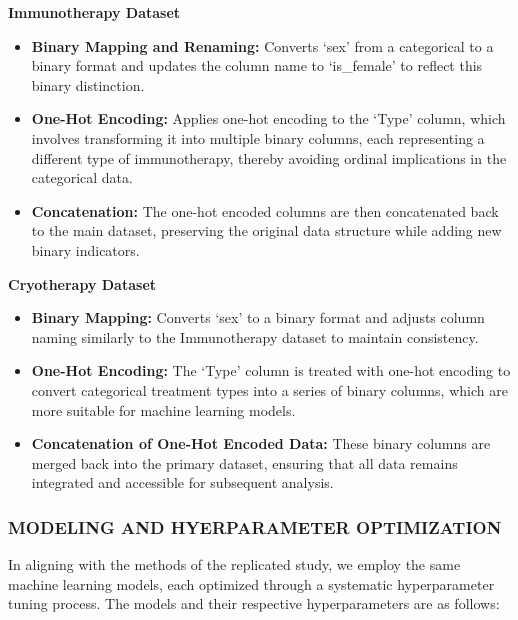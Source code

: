 \documentclass[11pt]{article}
\providecommand{\tightlist}{%
      \setlength{\itemsep}{0pt}\setlength{\parskip}{0pt}}
\begin{document}
\textbf{Immunotherapy Dataset}

\begin{itemize}
\tightlist
\item
  \textbf{Binary Mapping and Renaming:} Converts `sex' from a
  categorical to a binary format and updates the column name to
  `is\_female' to reflect this binary distinction.
\item
  \textbf{One-Hot Encoding:} Applies one-hot encoding to the `Type'
  column, which involves transforming it into multiple binary columns,
  each representing a different type of immunotherapy, thereby avoiding
  ordinal implications in the categorical data.
\item
  \textbf{Concatenation:} The one-hot encoded columns are then
  concatenated back to the main dataset, preserving the original data
  structure while adding new binary indicators.
\end{itemize}

\textbf{Cryotherapy Dataset}

\begin{itemize}
\tightlist
\item
  \textbf{Binary Mapping:} Converts `sex' to a binary format and adjusts
  column naming similarly to the Immunotherapy dataset to maintain
  consistency.
\item
  \textbf{One-Hot Encoding:} The `Type' column is treated with one-hot
  encoding to convert categorical treatment types into a series of
  binary columns, which are more suitable for machine learning models.
\item
  \textbf{Concatenation of One-Hot Encoded Data:} These binary columns
  are merged back into the primary dataset, ensuring that all data
  remains integrated and accessible for subsequent analysis.
\end{itemize}

    \hypertarget{modeling-and-hyerparameter-optimization}{%
\subsubsection{MODELING AND HYERPARAMETER
OPTIMIZATION}\label{modeling-and-hyerparameter-optimization}}

    In aligning with the methods of the replicated study, we employ the same
machine learning models, each optimized through a systematic
hyperparameter tuning process. The models and their respective
hyperparameters are as follows:
\end{document}
